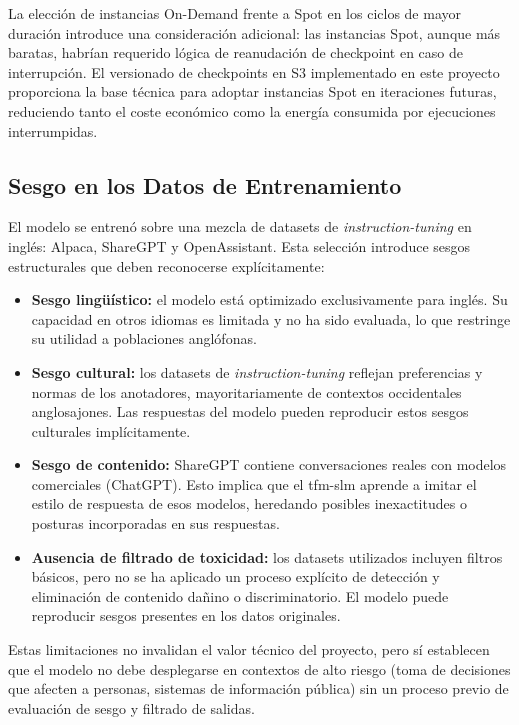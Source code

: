 La elección de instancias On-Demand frente a Spot en los ciclos de mayor duración introduce una consideración adicional: las instancias Spot, aunque más baratas, habrían requerido lógica de reanudación de checkpoint en caso de interrupción. El versionado de checkpoints en S3 implementado en este proyecto proporciona la base técnica para adoptar instancias Spot en iteraciones futuras, reduciendo tanto el coste económico como la energía consumida por ejecuciones interrumpidas.

\subsection{Sesgo en los Datos de Entrenamiento}

El modelo se entrenó sobre una mezcla de datasets de \textit{instruction-tuning} en inglés: Alpaca, ShareGPT y OpenAssistant. Esta selección introduce sesgos estructurales que deben reconocerse explícitamente:

\begin{itemize}
    \item \textbf{Sesgo lingüístico:} el modelo está optimizado exclusivamente para inglés. Su capacidad en otros idiomas es limitada y no ha sido evaluada, lo que restringe su utilidad a poblaciones anglófonas.
    \item \textbf{Sesgo cultural:} los datasets de \textit{instruction-tuning} reflejan preferencias y normas de los anotadores, mayoritariamente de contextos occidentales anglosajones. Las respuestas del modelo pueden reproducir estos sesgos culturales implícitamente.
    \item \textbf{Sesgo de contenido:} ShareGPT contiene conversaciones reales con modelos comerciales (ChatGPT). Esto implica que el tfm-slm aprende a imitar el estilo de respuesta de esos modelos, heredando posibles inexactitudes o posturas incorporadas en sus respuestas.
    \item \textbf{Ausencia de filtrado de toxicidad:} los datasets utilizados incluyen filtros básicos, pero no se ha aplicado un proceso explícito de detección y eliminación de contenido dañino o discriminatorio. El modelo puede reproducir sesgos presentes en los datos originales.
\end{itemize}

Estas limitaciones no invalidan el valor técnico del proyecto, pero sí establecen que el modelo no debe desplegarse en contextos de alto riesgo (toma de decisiones que afecten a personas, sistemas de información pública) sin un proceso previo de evaluación de sesgo y filtrado de salidas.

